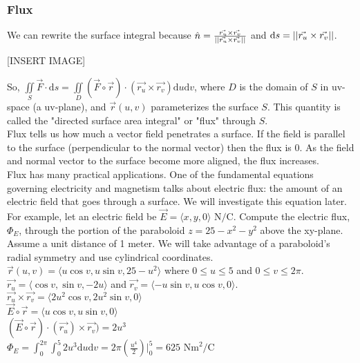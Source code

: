 \subsubsection{Flux}
\noindent
We can rewrite the surface integral because $\hat{n} = \frac{\vec{r_u} \times \vec{r_v}}{\left|\left|\vec{r_u} \times \vec{r_v}\right|\right|}$ and $\mathrm{d}s = \left|\left|\vec{r_u} \times \vec{r_v}\right|\right|$.

[INSERT IMAGE]

\noindent
So, $\iint\limits_{S}{\vec{F} \cdot \mathrm{d}s} = \iint\limits_{D}{\left(\vec{F}\circ\vec{r}\right) \cdot \left(\vec{r_u} \times \vec{r_v}\right)\mathrm{d}u\mathrm{d}v}$, where $D$ is the domain of $S$ in uv-space (a uv-plane), and $\vec{r}(u,v)$ parameterizes the surface $S$. This quantity is called the "directed surface area integral" or "flux" through $S$.\\

\noindent
Flux tells us how much a vector field penetrates a surface. If the field is parallel to the surface (perpendicular to the normal vector) then the flux is 0. As the field and normal vector to the surface become more aligned, the flux increases. \\

\noindent
Flux has many practical applications. One of the fundamental equations governing electricity and magnetism talks about electric flux: the amount of an electric field that goes through a surface. We will investigate this equation later.\\

\noindent
For example, let an electric field be $\vec{E} = \langle x, y, 0 \rangle \text{ N}/ \text{C}$. Compute the electric flux, $\Phi_{E}$, through the portion of the paraboloid $z=25-x^2-y^2$ above the xy-plane. Assume a unit distance of 1 meter.
\indent
We will take advantage of a paraboloid's radial symmetry and use cylindrical coordinates.\\
\indent
$\vec{r}(u,v) = \langle u\cos{v}, u\sin{v}, 25 - u^2 \rangle$ where $0 \leq u \leq 5$ and $0 \leq v \leq 2\pi$.\\
\indent
$\vec{r_u} = \langle \cos{v}, \sin{v}, -2u \rangle$ and $\vec{r_v}=\langle -u\sin{v}, u\cos{v}, 0 \rangle$.\\
\indent
$\vec{r_u} \times \vec{r_v} = \langle 2u^2\cos{v}, 2u^2\sin{v}, 0 \rangle$\\
\indent
$\vec{E}\circ\vec{r} = \langle u\cos{v}, u\sin{v}, 0 \rangle$\\
\indent
$\left(\vec{E}\circ\vec{r}\right) \cdot (\vec{r_u}) \times \vec{r_v}) = 2u^3$\\
\indent
$\Phi_{E} = \int_{0}^{2\pi}{\int_{0}^{5}{2u^3\mathrm{d}u}\mathrm{d}v} = 2\pi\left(\frac{u^4}{2}\right)\rvert_{0}^{5} = 625\text{ Nm}^2/\text{C}$